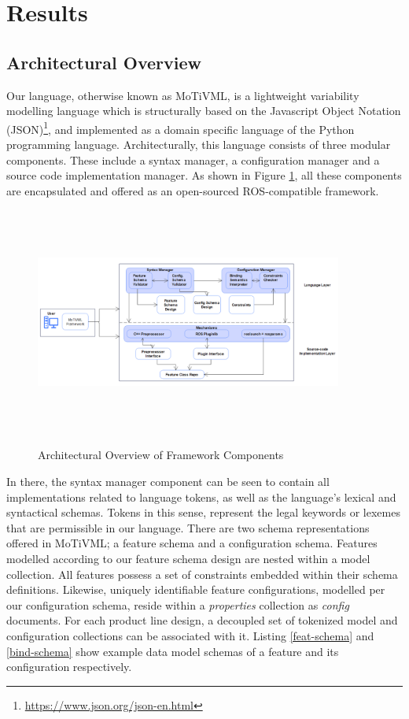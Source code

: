 \documentclass[conference]{IEEEtran}
\newcommand{\foot}[1]{\footnote{\url{#1}}}
\begin{document}
\section{Results}
\subsection{Architectural Overview}
Our language, otherwise known as MoTiVML, is a lightweight variability modelling language which is structurally based on the Javascript Object Notation (JSON)\foot{https://www.json.org/json-en.html}, and implemented as a domain specific language of the Python programming language. Architecturally, this language consists of three modular components. These include a syntax manager, a configuration manager and a source code implementation manager. As shown in Figure \ref{arch-over}, all these components are encapsulated and offered as an open-sourced ROS-compatible framework.

\begin{figure}[h]
	\caption{Architectural Overview of Framework Components}
	\centering
	\includegraphics[width=0.9\textwidth,height=7.5cm]{diagrams/arch-over-new.png}
	\label{arch-over}
\end{figure}

In there, the syntax manager component can be seen to contain all implementations related to language tokens, as well as the language's lexical and syntactical schemas. Tokens in this sense, represent the legal keywords or lexemes that are permissible in our language. There are two schema representations offered in MoTiVML; a feature schema and a configuration schema. Features modelled according to our feature schema design are nested within a model collection. All features possess a set of constraints embedded within their schema definitions. Likewise, uniquely identifiable feature configurations, modelled per our configuration schema, reside within a \textit{properties} collection as \textit{config} documents. For each product line design, a decoupled set of tokenized model and configuration collections can be associated with it. Listing \ref{feat-schema} and \ref{bind-schema} show example data model schemas of a feature and its configuration respectively.
\end{document}
